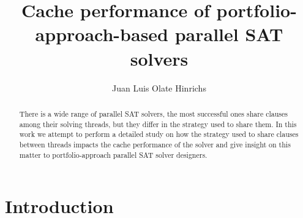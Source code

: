 \documentclass[12pt]{diicc}
\title{\bf Cache performance of portfolio-approach-based parallel SAT solvers}
\author{Juan Luis Olate Hinrichs}
\begin{document}
\frontmatter

%


%
\begin{abstract}
There is a wide range of parallel SAT solvers, the most successful ones share clauses among their solving threads, but they differ in the strategy used to share them. In this work we attempt to perform a detailed study on how the strategy used to share clauses between threads impacts the cache performance of the solver and give insight on this matter to portfolio-approach parallel SAT solver designers. 
\end{abstract}

%
% 
\mainmatter
\chapter{Introduction}\label{chap:intro}
\end{document}
